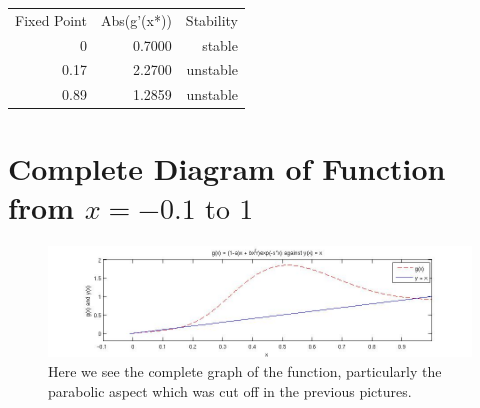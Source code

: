 \documentclass[12pt]{article}
\begin{document}
\begin{table}[h]
\centering
\begin{tabular}{rrr}
Fixed Point & Abs(g'(x*)) & Stability \\
0           & 0.7000      & stable    \\
0.17        & 2.2700      & unstable  \\
0.89        & 1.2859      & unstable   
\end{tabular}
\end{table}

\section*{Complete Diagram of Function from $x = -0.1 \text{ to } 1$}
\begin{figure}[H]
    \begin{center}
    \includegraphics[width=\linewidth]{P1_CompleteGraph}
    \end{center}
    \caption{Here we see the complete graph of the function, particularly the parabolic aspect which was cut off in the previous pictures.}
    \label{figure:2.1}
\end{figure}
\end{document}
